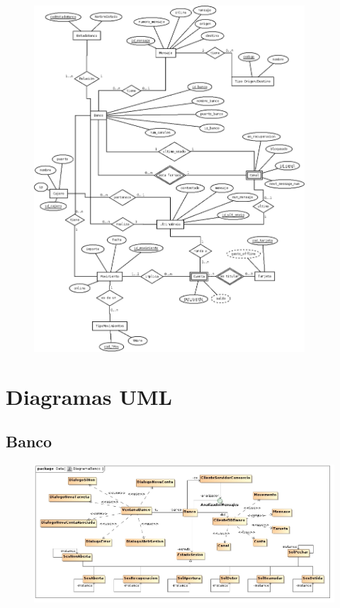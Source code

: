 \documentclass[a4paper,titlepage]{article}
\begin{document}
\begin{figure}[h!]
  \begin{center}
    \includegraphics[width=0.9\textwidth]{diagrama_bd_consorcio.png}
  \end{center}
\end{figure}



\clearpage
\newpage

\section {Diagramas UML}

\subsection{Banco}
\begin{figure}[h!]
  \begin{center}
    \includegraphics[width=0.85\textheight,angle=90]{MagicDraw/DiagramaBanco.jpg}
  \end{center}
\end{figure}
\end{document}
